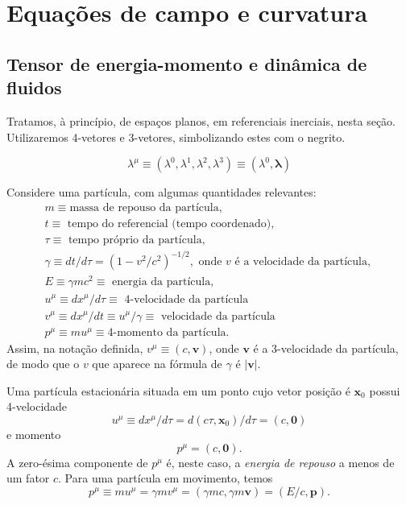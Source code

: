 \chapter{Equações de campo e curvatura}\label{cap:EquacoesDeCampoCurvatura}
\section{Tensor de energia-momento e dinâmica de fluidos}\label{sec:EnergiaMomentoFluidos}
Tratamos, à princípio, de espaços planos, em referenciais inerciais, nesta seção. Utilizaremos 4-vetores e 3-vetores, simbolizando estes com o negrito. 

\[
\lambda^{\mu} \equiv\left(\lambda^{0}, \lambda^{1}, \lambda^{2}, \lambda^{3}\right) \equiv\left(\lambda^{0}, \boldsymbol{\lambda}\right)
\]

Considere uma partícula, com algumas quantidades relevantes:
\[\begin{array}{l}
{m \equiv \text{massa de repouso da partícula,}} \\
{t \equiv \text { tempo do referencial (tempo coordenado), }} \\ 
{\tau \equiv \text { tempo próprio da partícula, }} \\ 
{\gamma \equiv d t / d \tau=\left(1-v^{2} / c^{2}\right)^{-1 / 2}, \text { onde } v \text { é a velocidade da partícula, }} \\ 
{E \equiv \gamma m c^{2} \equiv \text { energia da partícula, }} \\ 
{u^{\mu} \equiv d x^{\mu} / d \tau \equiv \text { 4-velocidade da partícula }} \\ 
{v^{\mu} \equiv d x^{\mu} / d t \equiv u^{\mu} / \gamma \equiv \text { velocidade da partícula}} \\ 
{p^{\mu} \equiv m u^{\mu} \equiv 4 \text {-momento da partícula. }}
\end{array}\] 
Assim, na notação definida, $ v^\mu \equiv (c, \mathbf{v}) $, onde $\mathbf{v}$ é a 3-velocidade da partícula, de modo que o $v$ que aparece na fórmula de $\gamma$ é $|\mathbf{v}|$. 

Uma partícula estacionária situada em um ponto cujo vetor posição é $\mathbf{x}_0$ possui 4-velocidade
\[
u^\mu \equiv dx^\mu/d\tau = d(c\tau,\mathbf{x}_0)/d\tau = (c,\mathbf{0})
\]
e momento
\[
p^{\mu}=(c,\mathbf{0}).
\]
A zero-ésima componente de $p^\mu$ é, neste caso, a \textit{energia de repouso} a menos de um fator $c$. Para uma partícula em movimento, temos 
\begin{equation}\label{eq:QuadriMomentoParticula}
	p^\mu \equiv mu^\mu = \gamma m v^\mu = (\gamma mc, \gamma m\mathbf{v})=(E/c,\mathbf{p}).
\end{equation}

